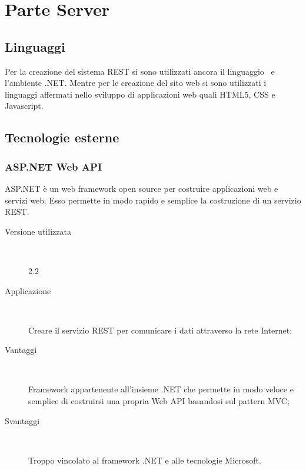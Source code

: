 \documentclass[../RelazioneFinale.tex]{subfiles}
\begin{document}
\newpage %
		
		\section{Parte Server}
		
			\subsection{Linguaggi}
				Per la creazione del sistema REST si sono utilizzati ancora il linguaggio \Csharp\ e l'ambiente .NET. Mentre per le creazione del sito web si sono utilizzati i linguaggi affermati nello sviluppo di applicazioni web quali HTML5, CSS e Javascript.
			
			\subsection{Tecnologie esterne}
			
			\subsubsection{ASP.NET Web API}
				ASP.NET è un web framework open source per costruire applicazioni web e servizi web. Esso permette in modo rapido e semplice la costruzione di un servizio REST.
				\begin{description}
					\item[Versione utilizzata] \ \par 
					2.2
					\item[Applicazione] \ \par
					Creare il servizio REST per comunicare i dati attraverso la rete Internet;
					\item[Vantaggi] \ \par
					Framework appartenente all'insieme .NET che permette in modo veloce e semplice di costruirsi una propria Web API basandosi sul pattern MVC;
					\item[Svantaggi] \ \par
					Troppo vincolato al framework .NET e alle tecnologie Microsoft.
				\end{description}
			
\end{document}
